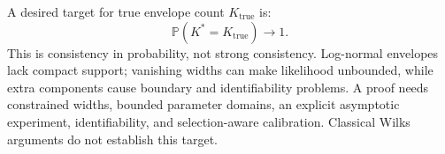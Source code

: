 \begin{remark}
  \label{thm:joint_consistency}
  A desired target for true envelope count $K_{\mathrm{true}}$ is:
  \begin{equation}
    \mathbb P(K^*=K_{\mathrm{true}})\longrightarrow1.
    \label{eq:consistency_result}
  \end{equation}
  This is consistency in probability, not strong consistency. Log-normal
  envelopes lack compact support; vanishing widths can make likelihood
  unbounded, while extra components cause boundary and identifiability
  problems. A proof needs constrained widths, bounded parameter domains,
  an explicit asymptotic experiment, identifiability, and selection-aware
  calibration. Classical Wilks arguments do not establish this target.
\end{remark}
